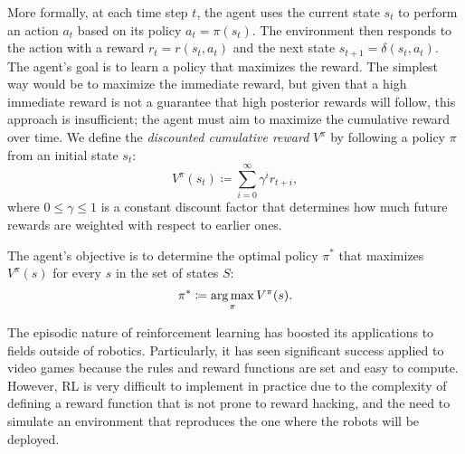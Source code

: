 More formally, at each time step $t$, the agent uses the current state $s_t$ to perform an action $a_t$ based on its policy $a_t=\pi(s_t)$. The environment then responds to the action with a reward $r_t=r(s_t, a_t)$ and the next state $s_{t+1}=\delta(s_t, a_t)$. The agent's goal is to learn a policy that maximizes the reward. The simplest way would be to maximize the immediate reward, but given that a high immediate reward is not a guarantee that high posterior rewards will follow, this approach is insufficient; the agent must aim to maximize the cumulative reward over time. We define the \textit{discounted cumulative reward} $V^\pi$ by following a policy $\pi$ from an initial state $s_t$:
\begin{equation*}
    V^\pi(s_t) \coloneq \sum^\infty_{i=0}\gamma^i r_{t+i},
\end{equation*}
where $0 \leq \gamma \leq 1$ is a constant discount factor that determines how much future rewards are weighted with respect to earlier ones. 

The agent's objective is to determine the optimal policy $\pi^*$ that maximizes $V^\pi(s)$ for every $s$ in the set of states $S$:
\begin{equation*}
    \pi^* \coloneq \operatorname*{arg\,max}_\pi V^\pi (s).
\end{equation*}

The episodic nature of reinforcement learning has boosted its applications to fields outside of robotics. Particularly, it has seen significant success applied to video games because the rules and reward functions are set and easy to compute. However, RL is very difficult to implement in practice due to the complexity of defining a reward function that is not prone to reward hacking, and the need to simulate an environment that reproduces the one where the robots will be deployed.

